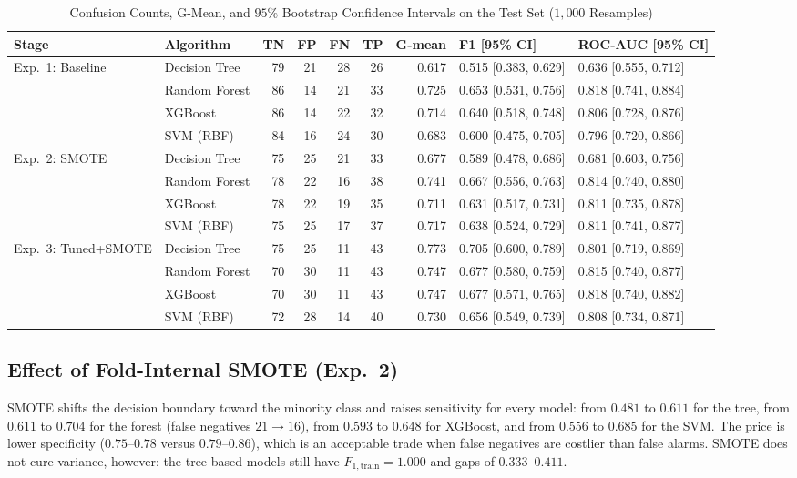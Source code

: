 \documentclass[journal]{IEEEtran}
\begin{document}
\begin{table}[t]
\centering
\caption{Confusion Counts, G-Mean, and $95\%$ Bootstrap Confidence Intervals on the Test Set ($1{,}000$ Resamples)}
\label{tab:cm_counts}
\footnotesize
\begin{tabular}{llrrrrrll}
\toprule
\textbf{Stage} & \textbf{Algorithm} & \textbf{TN} & \textbf{FP} & \textbf{FN} & \textbf{TP} & \textbf{G-mean} & \textbf{F1 [95\% CI]} & \textbf{ROC-AUC [95\% CI]} \\
\midrule
\multirow{4}{*}{Exp.~1: Baseline} & Decision Tree & 79 & 21 & 28 & 26 & 0.617 & 0.515 [0.383, 0.629] & 0.636 [0.555, 0.712] \\
 & Random Forest & 86 & 14 & 21 & 33 & 0.725 & 0.653 [0.531, 0.756] & 0.818 [0.741, 0.884] \\
 & XGBoost & 86 & 14 & 22 & 32 & 0.714 & 0.640 [0.518, 0.748] & 0.806 [0.728, 0.876] \\
 & SVM (RBF) & 84 & 16 & 24 & 30 & 0.683 & 0.600 [0.475, 0.705] & 0.796 [0.720, 0.866] \\
\midrule
\multirow{4}{*}{Exp.~2: SMOTE} & Decision Tree & 75 & 25 & 21 & 33 & 0.677 & 0.589 [0.478, 0.686] & 0.681 [0.603, 0.756] \\
 & Random Forest & 78 & 22 & 16 & 38 & 0.741 & 0.667 [0.556, 0.763] & 0.814 [0.740, 0.880] \\
 & XGBoost & 78 & 22 & 19 & 35 & 0.711 & 0.631 [0.517, 0.731] & 0.811 [0.735, 0.878] \\
 & SVM (RBF) & 75 & 25 & 17 & 37 & 0.717 & 0.638 [0.524, 0.729] & 0.811 [0.741, 0.877] \\
\midrule
\multirow{4}{*}{Exp.~3: Tuned+SMOTE} & Decision Tree & 75 & 25 & 11 & 43 & 0.773 & 0.705 [0.600, 0.789] & 0.801 [0.719, 0.869] \\
 & Random Forest & 70 & 30 & 11 & 43 & 0.747 & 0.677 [0.580, 0.759] & 0.815 [0.740, 0.877] \\
 & XGBoost & 70 & 30 & 11 & 43 & 0.747 & 0.677 [0.571, 0.765] & 0.818 [0.740, 0.882] \\
 & SVM (RBF) & 72 & 28 & 14 & 40 & 0.730 & 0.656 [0.549, 0.739] & 0.808 [0.734, 0.871] \\
\bottomrule
\end{tabular}
\end{table}

\subsection{Effect of Fold-Internal SMOTE (Exp.~2)}
SMOTE shifts the decision boundary toward the minority class and raises sensitivity for every model: from $0.481$ to $0.611$ for the tree, from $0.611$ to $0.704$ for the forest (false negatives $21 \to 16$), from $0.593$ to $0.648$ for XGBoost, and from $0.556$ to $0.685$ for the SVM. The price is lower specificity ($0.75$--$0.78$ versus $0.79$--$0.86$), which is an acceptable trade when false negatives are costlier than false alarms. SMOTE does not cure variance, however: the tree-based models still have $F_{1,\text{train}} = 1.000$ and gaps of $0.333$--$0.411$.
\end{document}
